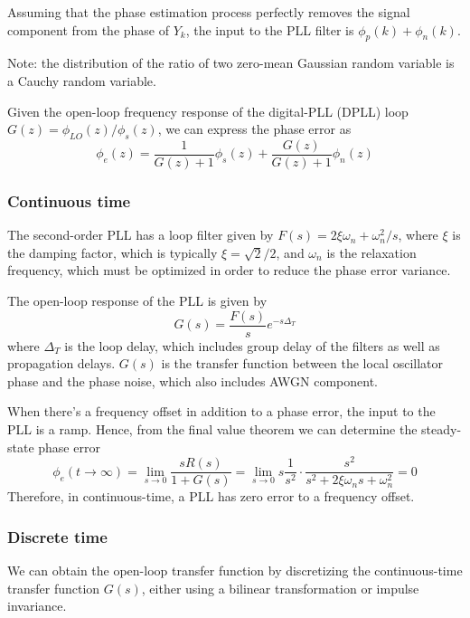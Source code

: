 \documentclass[a4paper]{article}
\begin{document}
Assuming that the phase estimation process perfectly removes the signal component from the phase of $Y_k$, the input to the PLL filter is $\phi_p(k) + \phi_n(k)$.

Note: the distribution of the ratio of two zero-mean Gaussian random variable is a Cauchy random variable.

Given the open-loop frequency response of the digital-PLL (DPLL) loop $G(z) = \phi_{LO}(z)/\phi_s(z)$, we can express the phase error as
\begin{equation}
	\phi_e(z) = \frac{1}{G(z)+1}\phi_s(z) + \frac{G(z)}{G(z) + 1}\phi_n(z)
\end{equation}


\subsubsection{Continuous time}

The second-order PLL has a loop filter given by $F(s) = 2\xi\omega_n + \omega_n^2/s$, where $\xi$ is the damping factor, which is typically $\xi = \sqrt{2}/2$, and $\omega_n$ is the relaxation frequency, which must be optimized in order to reduce the phase error variance.

The open-loop response of the PLL is given by
\begin{equation}
G(s) = \frac{F(s)}{s}e^{-s\Delta_T}
\end{equation}
where $\Delta_T$ is the loop delay, which includes group delay of the filters as well as propagation delays. $G(s)$ is the transfer function between the local oscillator phase and the phase noise, which also includes AWGN component. 

When there's a frequency offset in addition to a phase error, the input to the PLL is a ramp. Hence, from the final value theorem we can determine the steady-state phase error
\begin{equation}
\phi_e(t\to\infty) = \lim_{s\to 0} \frac{sR(s)}{1 + G(s)} = \lim_{s\to 0}s\frac{1}{s^2}\cdot\frac{s^2}{s^2 + 2\xi\omega_ns + \omega_n^2} = 0
\end{equation}
Therefore, in continuous-time, a PLL has zero error to a frequency offset.

\subsubsection{Discrete time}

We can obtain the open-loop transfer function by discretizing the continuous-time transfer function $G(s)$, either using a bilinear transformation or impulse invariance.
\end{document}
